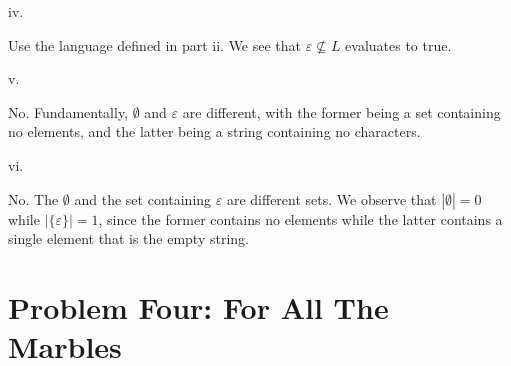 \documentclass{article}
\renewcommand{\(}{\left(}
\renewcommand{\)}{\right)}
\theoremstyle{plain}
\theoremstyle{plain}
\theoremstyle{definition}
\begin{document}
    iv.
    \begin{shaded}
        Use the language defined in part ii. We see that $\varepsilon\nsubseteq L$ evaluates to true.
    \end{shaded}
    v.
    \begin{shaded}
        No. Fundamentally, $\emptyset$ and $\varepsilon$ are different, with the former being a set containing no elements, and the latter being a string containing no characters.
    \end{shaded}
    
    vi.
    \begin{shaded}
        No. The $\emptyset$ and the set containing $\varepsilon$ are different sets. We observe that $|\emptyset|=0$ while $|\{\varepsilon\}|=1$, since the former contains no elements while the latter contains a single element that is the empty string.
    \end{shaded}

\newpage

\section*{Problem Four: For All The Marbles}
\end{document}
